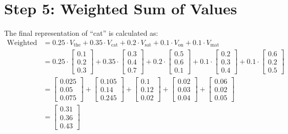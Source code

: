 \documentclass{article}
\begin{document}
\section*{Step 5: Weighted Sum of Values}
The final representation of ``cat'' is calculated as:
\[
\begin{aligned}
\text{Weighted Value} & = 0.25 \cdot V_{\text{the}} + 0.35 \cdot V_{\text{cat}} + 0.2 \cdot V_{\text{sat}} + 0.1 \cdot V_{\text{on}} + 0.1 \cdot V_{\text{mat}} \\
& = 0.25 \cdot \begin{bmatrix} 0.1 \\ 0.2 \\ 0.3 \end{bmatrix} + 0.35 \cdot \begin{bmatrix} 0.3 \\ 0.4 \\ 0.7 \end{bmatrix} + 0.2 \cdot \begin{bmatrix} 0.5 \\ 0.6 \\ 0.1 \end{bmatrix} + 0.1 \cdot \begin{bmatrix} 0.2 \\ 0.3 \\ 0.4 \end{bmatrix} + 0.1 \cdot \begin{bmatrix} 0.6 \\ 0.2 \\ 0.5 \end{bmatrix} \\
& = \begin{bmatrix} 0.025 \\ 0.05 \\ 0.075 \end{bmatrix} + \begin{bmatrix} 0.105 \\ 0.14 \\ 0.245 \end{bmatrix} + \begin{bmatrix} 0.1 \\ 0.12 \\ 0.02 \end{bmatrix} + \begin{bmatrix} 0.02 \\ 0.03 \\ 0.04 \end{bmatrix} + \begin{bmatrix} 0.06 \\ 0.02 \\ 0.05 \end{bmatrix} \\
& = \begin{bmatrix} 0.31 \\ 0.36 \\ 0.43 \end{bmatrix}
\end{aligned}
\]
\end{document}
